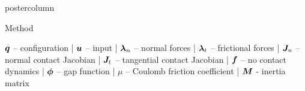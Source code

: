 \documentclass[final,hyperref={pdfpagelabels=false},5pt]{beamer}
\begin{document}
\begin{frame}
\begin{columns}
\begin{column}{.49\textwidth}
\begin{beamercolorbox}[center,wd=\textwidth]{postercolumn}
\begin{minipage}[T]{.95\textwidth}
{\begin{block}{Method}
              \begin{footnotesize}
                  \begin{center}
              $\bm{q}$ -- configuration | $\bm{u}$ -- input | $\NormalForce$ -- normal forces | $\FrictionForce$ -- frictional forces | $\Jn$ -- normal contact Jacobian | $\Jt$ -- tangential contact Jacobian | $\bm{f}$ -- no contact dynamics | $\bm{\phi}$ -- gap function | $\mu$ -- Coulomb friction coefficient | $\bm{M}$ - inertia matrix
                  \end{center}
              \end{footnotesize}
            \end{block}
            \footnotesize{\color{pennbl}
				
				}
				
				

				

    
          }
        \end{minipage}
        
      \end{beamercolorbox}
      
    \end{column}

\hfill


\end{columns}
\end{frame}
\end{document}
